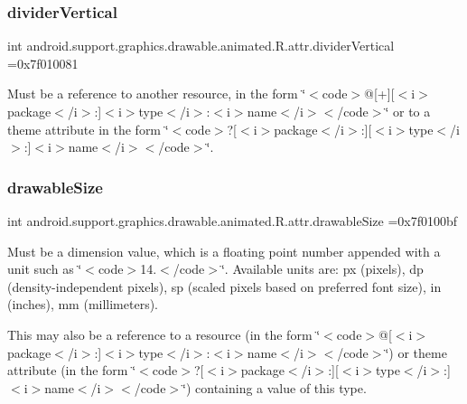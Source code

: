 \subsubsection{\texorpdfstring{divider\+Vertical}{dividerVertical}}
{\footnotesize\ttfamily int android.\+support.\+graphics.\+drawable.\+animated.\+R.\+attr.\+divider\+Vertical =0x7f010081\hspace{0.3cm}{\ttfamily [static]}}

Must be a reference to another resource, in the form \char`\"{}$<$code$>$@\mbox{[}+\mbox{]}\mbox{[}$<$i$>$package$<$/i$>$\+:\mbox{]}$<$i$>$type$<$/i$>$\+:$<$i$>$name$<$/i$>$$<$/code$>$\char`\"{} or to a theme attribute in the form \char`\"{}$<$code$>$?\mbox{[}$<$i$>$package$<$/i$>$\+:\mbox{]}\mbox{[}$<$i$>$type$<$/i$>$\+:\mbox{]}$<$i$>$name$<$/i$>$$<$/code$>$\char`\"{}. \mbox{\label{classandroid_1_1support_1_1graphics_1_1drawable_1_1animated_1_1R_1_1attr_aef6313459cc125b255493e3ee91c72bf}} 
\subsubsection{\texorpdfstring{drawable\+Size}{drawableSize}}
{\footnotesize\ttfamily int android.\+support.\+graphics.\+drawable.\+animated.\+R.\+attr.\+drawable\+Size =0x7f0100bf\hspace{0.3cm}{\ttfamily [static]}}

Must be a dimension value, which is a floating point number appended with a unit such as \char`\"{}$<$code$>$14.\+5sp$<$/code$>$\char`\"{}. Available units are\+: px (pixels), dp (density-\/independent pixels), sp (scaled pixels based on preferred font size), in (inches), mm (millimeters). 

This may also be a reference to a resource (in the form \char`\"{}$<$code$>$@\mbox{[}$<$i$>$package$<$/i$>$\+:\mbox{]}$<$i$>$type$<$/i$>$\+:$<$i$>$name$<$/i$>$$<$/code$>$\char`\"{}) or theme attribute (in the form \char`\"{}$<$code$>$?\mbox{[}$<$i$>$package$<$/i$>$\+:\mbox{]}\mbox{[}$<$i$>$type$<$/i$>$\+:\mbox{]}$<$i$>$name$<$/i$>$$<$/code$>$\char`\"{}) containing a value of this type. \mbox{\label{classandroid_1_1support_1_1graphics_1_1drawable_1_1animated_1_1R_1_1attr_af767e215000920db40a7dae8855ee31f}} 
